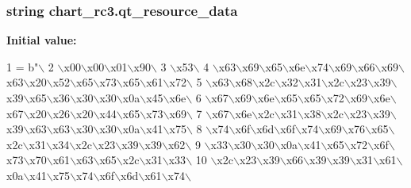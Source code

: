 \subsubsection[{qt\+\_\+resource\+\_\+data}]{\setlength{\rightskip}{0pt plus 5cm}string chart\+\_\+rc3.\+qt\+\_\+resource\+\_\+data}\label{namespacechart__rc3_ab7d064a9a512a3ba52ac9dbd1912613d}
{\bfseries Initial value\+:}
\begin{DoxyCode}
1 = b\textcolor{stringliteral}{"\(\backslash\)}
2 \textcolor{stringliteral}{\(\backslash\)x00\(\backslash\)x00\(\backslash\)x01\(\backslash\)x90\(\backslash\)}
3 \textcolor{stringliteral}{\(\backslash\)x53\(\backslash\)}
4 \textcolor{stringliteral}{\(\backslash\)x63\(\backslash\)x69\(\backslash\)x65\(\backslash\)x6e\(\backslash\)x74\(\backslash\)x69\(\backslash\)x66\(\backslash\)x69\(\backslash\)x63\(\backslash\)x20\(\backslash\)x52\(\backslash\)x65\(\backslash\)x73\(\backslash\)x65\(\backslash\)x61\(\backslash\)x72\(\backslash\)}
5 \textcolor{stringliteral}{\(\backslash\)x63\(\backslash\)x68\(\backslash\)x2c\(\backslash\)x32\(\backslash\)x31\(\backslash\)x2c\(\backslash\)x23\(\backslash\)x39\(\backslash\)x39\(\backslash\)x65\(\backslash\)x36\(\backslash\)x30\(\backslash\)x30\(\backslash\)x0a\(\backslash\)x45\(\backslash\)x6e\(\backslash\)}
6 \textcolor{stringliteral}{\(\backslash\)x67\(\backslash\)x69\(\backslash\)x6e\(\backslash\)x65\(\backslash\)x65\(\backslash\)x72\(\backslash\)x69\(\backslash\)x6e\(\backslash\)x67\(\backslash\)x20\(\backslash\)x26\(\backslash\)x20\(\backslash\)x44\(\backslash\)x65\(\backslash\)x73\(\backslash\)x69\(\backslash\)}
7 \textcolor{stringliteral}{\(\backslash\)x67\(\backslash\)x6e\(\backslash\)x2c\(\backslash\)x31\(\backslash\)x38\(\backslash\)x2c\(\backslash\)x23\(\backslash\)x39\(\backslash\)x39\(\backslash\)x63\(\backslash\)x63\(\backslash\)x30\(\backslash\)x30\(\backslash\)x0a\(\backslash\)x41\(\backslash\)x75\(\backslash\)}
8 \textcolor{stringliteral}{\(\backslash\)x74\(\backslash\)x6f\(\backslash\)x6d\(\backslash\)x6f\(\backslash\)x74\(\backslash\)x69\(\backslash\)x76\(\backslash\)x65\(\backslash\)x2c\(\backslash\)x31\(\backslash\)x34\(\backslash\)x2c\(\backslash\)x23\(\backslash\)x39\(\backslash\)x39\(\backslash\)x62\(\backslash\)}
9 \textcolor{stringliteral}{\(\backslash\)x33\(\backslash\)x30\(\backslash\)x30\(\backslash\)x0a\(\backslash\)x41\(\backslash\)x65\(\backslash\)x72\(\backslash\)x6f\(\backslash\)x73\(\backslash\)x70\(\backslash\)x61\(\backslash\)x63\(\backslash\)x65\(\backslash\)x2c\(\backslash\)x31\(\backslash\)x33\(\backslash\)}
10 \textcolor{stringliteral}{\(\backslash\)x2c\(\backslash\)x23\(\backslash\)x39\(\backslash\)x66\(\backslash\)x39\(\backslash\)x39\(\backslash\)x31\(\backslash\)x61\(\backslash\)x0a\(\backslash\)x41\(\backslash\)x75\(\backslash\)x74\(\backslash\)x6f\(\backslash\)x6d\(\backslash\)x61\(\backslash\)x74\(\backslash\)}

\end{DoxyCode}
